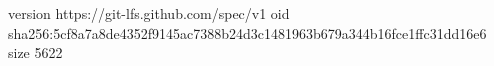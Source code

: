 version https://git-lfs.github.com/spec/v1
oid sha256:5cf8a7a8de4352f9145ac7388b24d3c1481963b679a344b16fce1ffc31dd16e6
size 5622
